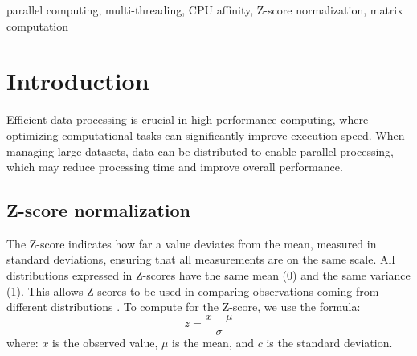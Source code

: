 \documentclass[journal]{./IEEE/IEEEtran}
\title{\SPTITLE}
\author{\ADVISEE
\REMARK
}
\begin{document}
\maketitle

\begin{abstract}
    This research examines the performance of a multi-threaded master-slave architecture for computing the Z-score normalization of a square matrix. The program utilizes socket communication to distribute submatrices to multiple slave processes, allowing for parallel processing. The study investigates the impact of varying the number of slave processes on the runtime of the Z-score normalization computation. The results demonstrate that increasing the number of slaves significantly reduces runtime, highlighting the benefits of distributed computing for large-scale matrix computations.
\end{abstract}

\begin{keywords}
parallel computing, multi-threading, CPU affinity, Z-score normalization, matrix computation
\end{keywords}

\section{Introduction}
Efficient data processing is crucial in high-performance computing, where optimizing computational tasks can significantly improve execution speed. When managing large datasets, data can be distributed to enable parallel processing, which may reduce processing time and improve overall performance.

\subsection{Z-score normalization}
The Z-score indicates how far a value deviates from the mean, measured in standard deviations, ensuring that all measurements are on the same scale\cite{andrade2021z}.
All distributions expressed in Z-scores have the same mean (0) and the same variance (1). This allows Z-scores to be used in comparing observations coming from different distributions \cite{abdi2007z}.
To compute for the Z-score, we use the formula:
\begin{equation}
\label{zscoreformula}
    z=\frac{x-\mu}{\sigma}
\end{equation}
where:
\( x \) is the observed value,  
\( \mu \) is the mean, and
\( c \) is the standard deviation.
\end{document}
